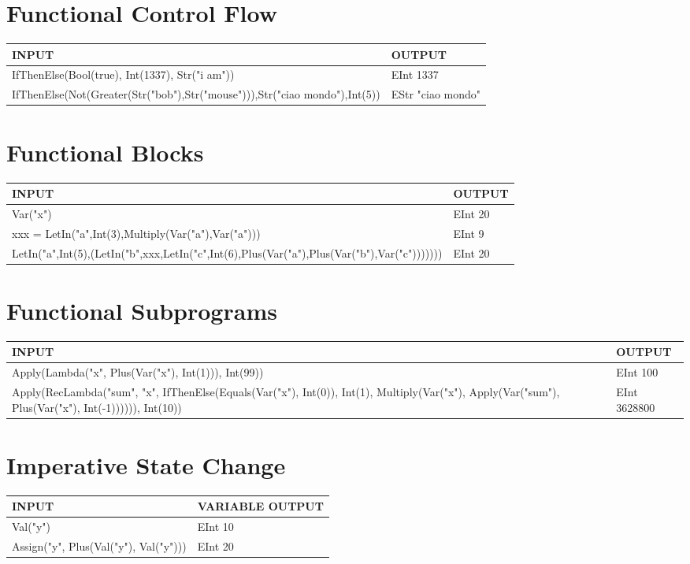 \documentclass[11pt]{report}
\begin{document}
\chapter{Functional Control Flow}
\label{sec:org775055a}
\begin{center}
\begin{tabularx}{\textwidth}{Xl}
INPUT & OUTPUT\\
\hline
IfThenElse(Bool(true), Int(1337), Str("i am")) & EInt 1337\\
IfThenElse(Not(Greater(Str("bob"),Str("mouse"))),Str("ciao mondo"),Int(5)) & EStr "ciao mondo"\\
\end{tabularx}
\end{center}
\chapter{Functional Blocks}
\label{sec:org62edac2}
\begin{center}
\begin{tabularx}{\textwidth}{Xl}
INPUT & OUTPUT\\
\hline
Var("x") & EInt 20\\
xxx = LetIn("a",Int(3),Multiply(Var("a"),Var("a"))) & EInt 9\\
LetIn("a",Int(5),(LetIn("b",xxx,LetIn("c",Int(6),Plus(Var("a"),Plus(Var("b"),Var("c"))))))) & EInt 20\\
\end{tabularx}
\end{center}
\chapter{Functional Subprograms}
\label{sec:orgb9774d1}
\begin{center}
\begin{tabularx}{\textwidth}{Xl}
INPUT & OUTPUT\\
\hline
Apply(Lambda("x", Plus(Var("x"), Int(1))), Int(99)) & EInt 100\\
Apply(RecLambda("sum", "x", IfThenElse(Equals(Var("x"), Int(0)), Int(1), Multiply(Var("x"), Apply(Var("sum"), Plus(Var("x"), Int(-1)))))), Int(10)) & EInt 3628800\\
\end{tabularx}
\end{center}
\chapter{Imperative State Change}
\label{sec:org8733e80}
\begin{center}
\begin{tabularx}{\textwidth}{ll}
INPUT & VARIABLE OUTPUT\\
\hline
Val("y") & EInt 10\\
Assign("y", Plus(Val("y"), Val("y"))) & EInt 20\\
\end{tabularx}
\end{center}
\end{document}
